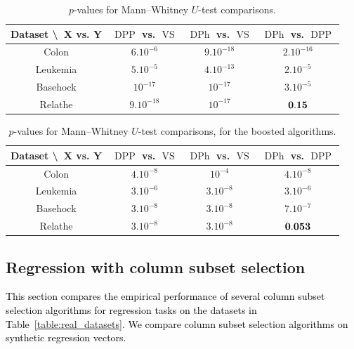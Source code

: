 \documentclass[twoside,11pt]{book}
\newcommand{\rev}[1]{\textcolor{black}{#1}}
\numberwithin{theorem}{chapter}
\numberwithin{definition}{chapter}
\numberwithin{proposition}{chapter}
\numberwithin{corollary}{chapter}
\numberwithin{example}{chapter}
\numberwithin{lemma}{chapter}
\numberwithin{assumption}{chapter}
\numberwithin{equation}{chapter}
\numberwithin{figure}{chapter}
\DeclareMathOperator{\DPP}{\mathrm{DPP}}
\DeclareMathOperator{\VS}{\mathrm{VS}}
\DeclareMathOperator{\DPh}{\mathrm{DPh}}
\begin{document}
\begin{table}[h]
\centering
 \begin{tabular}{| c| c | c| c|}
 \hline
  Dataset \textbackslash ~X vs. Y & $\DPP$ vs. $\VS$ & $\DPh$ vs. $\VS$  & $\DPh$ vs. $\DPP$\\
 \hline
 Colon & $6.10^{-6}$ & $9.10^{-18}$  & $2.10^{-16}$\\
 \hline
 Leukemia & $5.10^{-5}$ & $4.10^{-13}$ & $2.10^{-5}$\\
 \hline
 Basehock & $10^{-17}$ &$10^{-17}$ & $3.10^{-5}$ \\
 \hline
 Relathe & $9.10^{-18}$ & $10^{-17}$ & $\bf 0.15$\\
 \hline
\end{tabular}
\caption{$p$-values for Mann–Whitney $U$-test comparisons.
\label{t:tests}}
\end{table}

\begin{table}[h]
\centering
 \begin{tabular}{| c| c | c| c|}
   \hline
    Dataset \textbackslash ~X vs. Y & $\DPP$ vs. $\VS$ & $\DPh$ vs. $\VS$  & $\DPh$ vs. $\DPP$\\
 \hline
 Colon & $4.10^{-8}$ & $10^{-4}$  & $4.10^{-8}$\\
 \hline
 Leukemia & $3.10^{-6}$ & $3.10^{-8}$ & $3.10^{-6}$\\
 \hline
 Basehock & $3.10^{-8}$ &$3.10^{-8}$ & $7.10^{-7}$ \\
 \hline
 Relathe & $3.10^{-8}$ & $3.10^{-8}$ & $\bf 0.053$\\
 \hline
\end{tabular}
\caption{
$p$-values for Mann–Whitney $U$-test comparisons, for the boosted algorithms.
\label{t:tests_boosted}
}
\end{table}

\subsection{Regression with column subset selection} \label{sec:num_sim_regression_1}
\rev{
This section compares the empirical performance of several column subset selection algorithms for regression tasks on the datasets in Table~\ref{table:real_datasets}. We compare column subset selection algorithms on synthetic regression vectors.}
\end{document}
